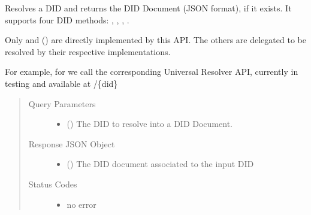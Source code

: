 \documentclass[a4paper,12pt,english]{sphinxhowto}
\begin{document}
\begin{fulllineitems}
\sphinxAtStartPar
Resolves a DID and returns the DID Document (JSON format), if it exists.
It supports four DID methods: , , , .

\sphinxAtStartPar
Only  and  () are directly implemented by this API.
The others are delegated to be resolved by their respective implementations.

\sphinxAtStartPar
For example, for  we call the corresponding Universal Resolver API, currently in testing and available at
/\{did\}
\begin{quote}\begin{description}
\item[{Query Parameters}] \leavevmode\begin{itemize}
\item {} 
\sphinxAtStartPar
{} () \textendash{} The DID to resolve into a DID Document.

\end{itemize}

\item[{Response JSON Object}] \leavevmode\begin{itemize}
\item {} 
\sphinxAtStartPar
{} () \textendash{} The DID document associated to the input DID

\end{itemize}

\item[{Status Codes}] \leavevmode\begin{itemize}
\item {} 
\sphinxAtStartPar
{} \textendash{} no error


\end{itemize}
\end{description}
\end{quote}
\end{fulllineitems}
\end{document}
